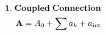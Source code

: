 \documentclass[preview]{standalone}
\begin{document}
\begin{align*}
\special{dvisvgm:raw <g id='unique000'>}\mathbf{1.\;Coupled\;Connection}\\\mathbf{A}=A_0+\sum a_k+a_{\text{int}}\special{dvisvgm:raw </g>}
\end{align*}
\end{document}
